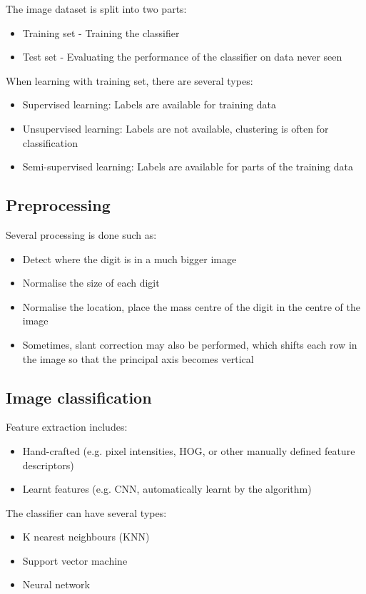 \documentclass{report}
\begin{document}
The image dataset is split into two parts:
\begin{itemize}
    \item Training set - Training the classifier  
    \item Test set - Evaluating the performance of the classifier on data never seen
\end{itemize}

When learning with training set, there are several types:
\begin{itemize}
    \item Supervised learning: Labels are available for training data 
    \item Unsupervised learning: Labels are not available, clustering is often
    for classification 
    \item Semi-supervised learning: Labels are available for parts of the
    training data
\end{itemize}

\subsection{Preprocessing}

Several processing is done such as:
\begin{itemize}
    \item Detect where the digit is in a much bigger image
    \item Normalise the size of each digit 
    \item Normalise the location, place the mass centre of the digit in the centre of the image
    \item Sometimes, slant correction may also be performed, which shifts each row in the
    image so that the principal axis becomes vertical
\end{itemize}

\subsection{Image classification}

Feature extraction includes:
\begin{itemize}
    \item Hand-crafted (e.g. pixel intensities, HOG, or other manually defined
    feature descriptors)
    \item Learnt features (e.g. CNN, automatically learnt by the algorithm)
\end{itemize}

The classifier can have several types:
\begin{itemize}
    \item K nearest neighbours (KNN)
    \item Support vector machine
    \item Neural network 
\end{itemize}
\end{document}
